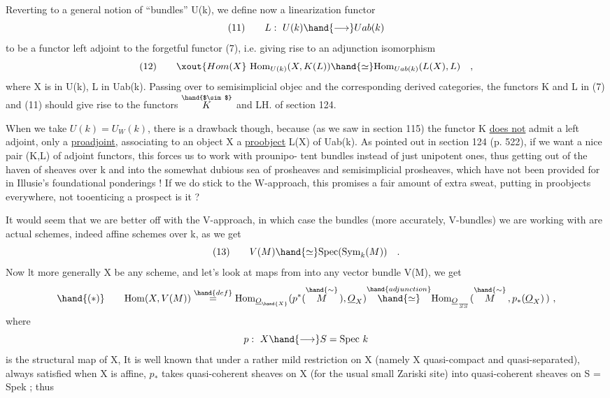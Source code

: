 
Reverting to a general notion of ``bundles'' U(k),  we define now a
linearization functor
\[ (11) \qquad L:\ U(k) \hand{\longrightarrow} Uab(k) \]
to be a functor left adjoint to the forgetful functor (7),  i.e. giving
rise to an adjunction isomorphism
\[ (12) \qquad \xout{Hom(X} \ \mathrm{Hom}_{U(k)}(X, K(L)) \hand{\simeq} \mathrm{Hom}_{Uab(k)}(L(X), L) \quad , \]
where X is in U(k),  L in Uab(k).  Passing over to semisimplicial objec
and the corresponding derived categories,  the functors K and L in
(7) and (11) should give rise to the functors $\overset{\hand{$\sim$}}{K}$ and LH.  of section
124.

When we take  $U(k) = U_W(k)$,  there is a drawback though,  because
(as we saw in section 115) the functor K \uline{does not} admit a left adjoint,
only a \uline{proadjoint},  associating to an object X a \uline{proobject} L(X) of
Uab(k).  As pointed out in section 124 (p. 522),  if we want a nice
pair (K,L) of adjoint functors,  this forces us to work with prounipo-%
tent bundles instead of just unipotent ones,  thus getting out of the
haven of sheaves over k and into the somewhat dubious sea of prosheaves
and semisimplicial prosheaves,  which have not been provided for in
Illusie's foundational ponderings !  If we do stick to the W-approach,
this promises   a fair amount of extra sweat,  putting in proobjects
everywhere,  not tooenticing a prospect is it ?

It would seem that we are better off with the V-approach,  in which
case the  bundles (more accurately, V-bundles) we are working 
with are actual schemes,  indeed affine schemes over k,  as we get
\[ (13) \qquad V(M) \hand{\simeq} \mathrm{Spec}(\mathrm{Sym}_k(M)) \quad . \]
Now lt more generally X be any scheme,  and let's look at maps from
 into any vector bundle V(M),  we get
\[ \hand{(*)} \qquad \mathrm{Hom}(X,V(M)) \overset{\hand{def}}{=} \mathrm{Hom}_{\underline{O}_{\hand{X}}}(p^*(\overset{\hand{\sim}}{M}\,), \underline{O}_X) \overset{\hand{adjunction}}{\hand{\simeq}} \mathrm{Hom}_{\underline{O}_{\over{S}{S}}}(\overset{\hand{\sim}}{M}\,, p_*(\underline{O}_X)\,)\ , \]
where
\[ p:\ X \hand{\longrightarrow} S = \mathrm{Spec}\ k \]
is the structural map of X, It is well known that under a rather mild
restriction on X (namely X  quasi-compact and quasi-separated),
always satisfied when X is affine,  $p_*$ takes quasi-coherent sheaves on
X (for the usual small Zariski site) into quasi-coherent sheaves on
S = Spek ;  thus 


